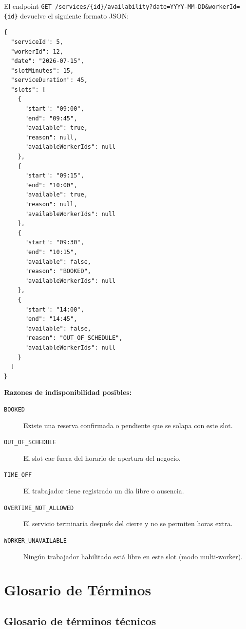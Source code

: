 \documentclass[12pt,a4paper,twoside]{report}
\begin{document}
El endpoint \texttt{GET /services/\{id\}/availability?date=YYYY-MM-DD\&workerId=\{id\}} devuelve el siguiente formato JSON:

\begin{lstlisting}[style=yamlStyle, caption={Ejemplo de respuesta del endpoint de disponibilidad}, label={lst:availability-response}]
{
  "serviceId": 5,
  "workerId": 12,
  "date": "2026-07-15",
  "slotMinutes": 15,
  "serviceDuration": 45,
  "slots": [
    {
      "start": "09:00",
      "end": "09:45",
      "available": true,
      "reason": null,
      "availableWorkerIds": null
    },
    {
      "start": "09:15",
      "end": "10:00",
      "available": true,
      "reason": null,
      "availableWorkerIds": null
    },
    {
      "start": "09:30",
      "end": "10:15",
      "available": false,
      "reason": "BOOKED",
      "availableWorkerIds": null
    },
    {
      "start": "14:00",
      "end": "14:45",
      "available": false,
      "reason": "OUT_OF_SCHEDULE",
      "availableWorkerIds": null
    }
  ]
}
\end{lstlisting}

\textbf{Razones de indisponibilidad posibles:}
\begin{description}
  \item[\texttt{BOOKED}] Existe una reserva confirmada o pendiente que se solapa con este slot.
  \item[\texttt{OUT\_OF\_SCHEDULE}] El slot cae fuera del horario de apertura del negocio.
  \item[\texttt{TIME\_OFF}] El trabajador tiene registrado un día libre o ausencia.
  \item[\texttt{OVERTIME\_NOT\_ALLOWED}] El servicio terminaría después del cierre y no se permiten horas extra.
  \item[\texttt{WORKER\_UNAVAILABLE}] Ningún trabajador habilitado está libre en este slot (modo multi-worker).
\end{description}

\chapter{Glosario de Términos}

\section{Glosario de términos técnicos}
\end{document}
